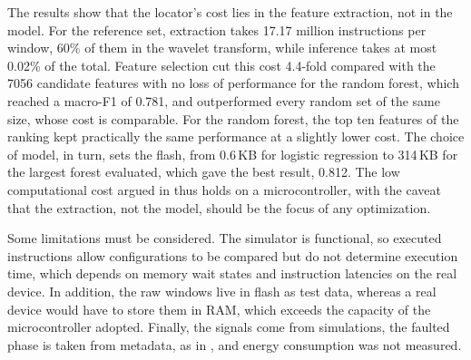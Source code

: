 \documentclass[11pt,a4paper]{article}
\begin{document}
The results show that the locator's cost lies in the feature extraction, not in the model. For the reference set, extraction takes 17.17 million instructions per window, 60\% of them in the wavelet transform, while inference takes at most 0.02\% of the total. Feature selection cut this cost 4.4-fold compared with the 7056 candidate features with no loss of performance for the random forest, which reached a macro-F1 of 0.781, and outperformed every random set of the same size, whose cost is comparable. For the random forest, the top ten features of the ranking kept practically the same performance at a slightly lower cost. The choice of model, in turn, sets the flash, from 0.6\,KB for logistic regression to 314\,KB for the largest forest evaluated, which gave the best result, 0.812. The low computational cost argued in \citet{martins_tcc_en} thus holds on a microcontroller, with the caveat that the extraction, not the model, should be the focus of any optimization.

Some limitations must be considered. The simulator is functional, so executed instructions allow configurations to be compared but do not determine execution time, which depends on memory wait states and instruction latencies on the real device. In addition, the raw windows live in flash as test data, whereas a real device would have to store them in RAM, which exceeds the capacity of the microcontroller adopted. Finally, the signals come from simulations, the faulted phase is taken from metadata, as in \citet{martins_tcc_en}, and energy consumption was not measured.
\end{document}
